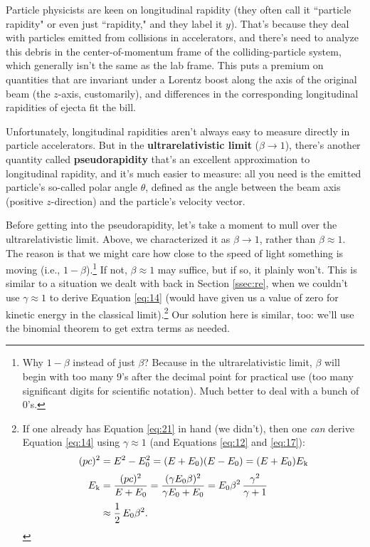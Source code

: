 \documentclass[12pt]{article}
\begin{document}
Particle physicists are keen on longitudinal rapidity (they often call it ``particle rapidity" or even just ``rapidity," and they label it $y$). That's because they deal with particles emitted from collisions in accelerators, and there's need to analyze this debris in the center-of-momentum frame of the colliding-particle system, which generally isn't the same as the lab frame. This puts a premium on quantities that are invariant under a Lorentz boost along the axis of the original beam (the $z$-axis, customarily), and differences in the corresponding longitudinal rapidities of ejecta fit the bill.

Unfortunately, longitudinal rapidities aren't always easy to measure directly in particle accelerators. But in the \textbf{ultrarelativistic limit} ($\beta \rightarrow 1$), there's another quantity called \textbf{pseudorapidity} that's an excellent approximation to longitudinal rapidity, and it's much easier to measure: all you need is the emitted particle's so-called polar angle $\theta$, defined as the angle between the beam axis (positive $z$-direction) and the particle's velocity vector.

Before getting into the pseudorapidity, let's take a moment to mull over the ultrarelativistic limit. Above, we characterized it as $\beta \rightarrow 1$, rather than $\beta \approx 1$. The reason is that we might care how close to the speed of light something is moving (i.e., $1 - \beta$).\footnote{Why $1 - \beta$ instead of just $\beta$? Because in the ultrarelativistic limit, $\beta$ will begin with too many $9$'s after the decimal point for practical use (too many significant digits for scientific notation). Much better to deal with a bunch of $0$'s.} If not, $\beta \approx 1$ may suffice, but if so, it plainly won't. This is similar to a situation we dealt with back in Section \ref{ssec:re}, when we couldn't use $\gamma \approx 1$ to derive Equation \ref{eq:14} (would have given us a value of zero for kinetic energy in the classical limit).\footnote{If one already has Equation \ref{eq:21} in hand (we didn't), then one \emph{can} derive Equation \ref{eq:14} using $\gamma \approx 1$ (and Equations \ref{eq:12} and \ref{eq:17}):
\begin{equation*}
\begin{split}
(pc)^2 &= E^2 - E_0^2 = (E + E_0) (E - E_0) = (E + E_0) E_{\mkern.5mu \textrm{k}} \\[2pt]
E_{\mkern.5mu \textrm{k}} &= \dfrac{(pc)^2}{E + E_0} = \dfrac{(\gamma E_0 \beta)^2}{\gamma E_0 + E_0} = E_0 \beta^2 \, \dfrac{\gamma^2}{\gamma + 1} \\[2pt]
&\approx \dfrac{1}{2} \, E_0 \beta^2 .
\end{split}
\end{equation*}
} Our solution here is similar, too: we'll use the binomial theorem to get extra terms as needed.
\end{document}
